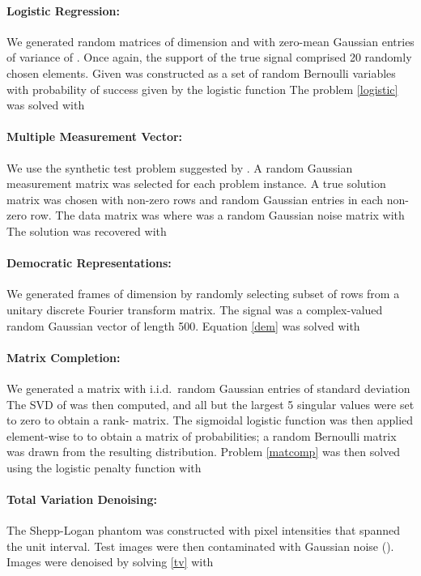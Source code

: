 \documentclass{amsart}
\theoremstyle{definition}
\begin{document}
\paragraph{\textbf{Logistic Regression:}}
 
We generated random matrices  of dimension   and  with zero-mean Gaussian entries of variance of .  Once again, the support of the true signal comprised 20 randomly chosen elements.  Given   was constructed as a set of random Bernoulli variables with probability of success given by the logistic function   The problem \eqref{logistic} was solved with 

\paragraph{\textbf{Multiple Measurement Vector:}}
We use the synthetic test problem suggested by \cite{CREK05}.  A random Gaussian measurement matrix  was selected for each problem instance.  A true solution matrix  was chosen with  non-zero rows and random Gaussian entries in each non-zero row.  The data matrix was  where  was a random Gaussian noise matrix with    The solution was recovered with 


\paragraph{\textbf{Democratic Representations:}} 
We generated frames of dimension  by randomly selecting subset of rows from a unitary discrete Fourier transform matrix.  The signal  was a complex-valued random Gaussian vector of length 500.  Equation \eqref{dem} was solved with 

\paragraph{\textbf{Matrix Completion:}}
We generated a  matrix  with i.i.d.\ random Gaussian entries of standard deviation 
The SVD of  was then computed, and all but the largest 5 singular values were set to zero to obtain a rank- matrix.  The sigmoidal logistic function was then applied element-wise to  to obtain a matrix of probabilities; a random Bernoulli matrix  was drawn from the resulting distribution.  Problem \eqref{matcomp} was then solved using the logistic penalty function with 
     
 
\paragraph{\textbf{Total Variation Denoising:}}
 The  Shepp-Logan phantom was constructed with pixel intensities that spanned the unit interval.  Test images were then contaminated with Gaussian noise ().  Images were denoised by solving \eqref{tv} with 
\end{document}
